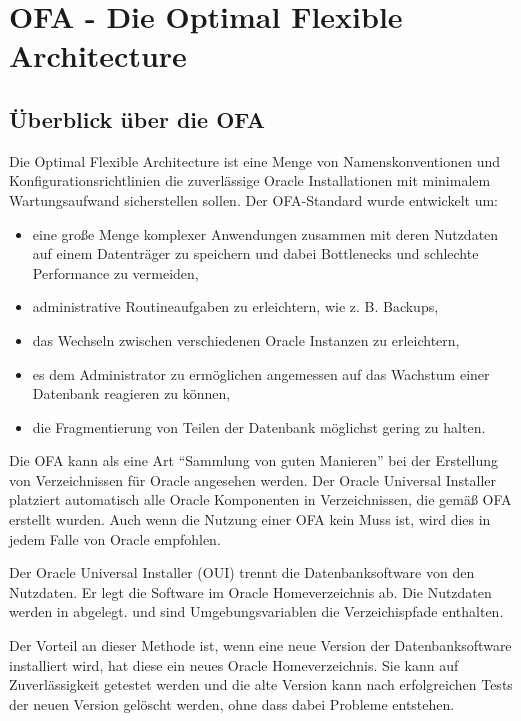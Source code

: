     \section{OFA - Die Optimal Flexible Architecture}
      \subsection{\"Uberblick \"uber die OFA}
        Die Optimal Flexible Architecture ist eine Menge von Namenskonventionen und Konfigurationsrichtlinien die zuverl\"assige Oracle Installationen mit minimalem Wartungsaufwand sicherstellen sollen. Der OFA-Standard wurde entwickelt um:
        \begin{itemize}
          \item eine gro\ss e Menge komplexer Anwendungen zusammen mit deren Nutzdaten auf einem Datentr\"ager zu speichern und dabei Bottlenecks und schlechte Performance zu vermeiden,
          \item administrative Routineaufgaben zu erleichtern, wie z. B. Backups,
          \item das Wechseln zwischen verschiedenen Oracle Instanzen zu erleichtern,
          \item es dem Administrator zu erm\"oglichen angemessen auf das Wachstum einer Datenbank reagieren zu k\"onnen,
          \item die Fragmentierung von Teilen der Datenbank m\"oglichst gering zu halten.
        \end{itemize}
        Die OFA kann als eine Art \enquote{Sammlung von guten Manieren} bei der Erstellung von Verzeichnissen f\"ur Oracle angesehen werden. Der Oracle Universal Installer platziert automatisch alle Oracle Komponenten in Verzeichnissen, die gem\"a\ss{} OFA erstellt wurden. Auch wenn die Nutzung einer OFA kein Muss ist, wird dies in jedem Falle von Oracle empfohlen.

        Der Oracle Universal Installer (OUI) trennt die Datenbanksoftware von den Nutzdaten. Er legt die Software im Oracle Homeverzeichnis  ab. Die Nutzdaten werden in  abgelegt.  und  sind Umgebungsvariablen die Verzeichispfade enthalten.

        Der Vorteil an dieser Methode ist, wenn eine neue Version der Datenbanksoftware installiert wird, hat diese ein neues Oracle Homeverzeichnis. Sie kann auf Zuverl\"assigkeit getestet werden und die alte Version kann nach erfolgreichen Tests der neuen Version gel\"oscht werden, ohne dass dabei Probleme entstehen.
